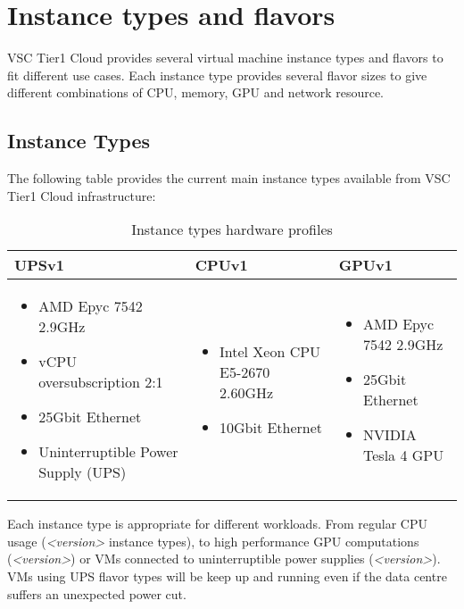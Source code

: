 \chapter{Instance types and flavors}

VSC Tier1 Cloud provides several virtual machine instance types
and flavors to fit different use cases.
Each instance type provides several flavor sizes to give different
combinations of CPU, memory, GPU and network resource.

\section{Instance Types}\label{sec:instance-types}
The following table provides the current main instance types available
from VSC Tier1 Cloud infrastructure:

\begin{table}[h!]
\centering
\begin{tabular}{ |p{6cm}|p{4cm}|p{5cm}| }
  \hline
  \rowcolor{lightgray} \textbf{UPSv1} & \textbf{CPUv1} & \textbf{GPUv1} \\
  \hline
  \begin{itemize}
    \item AMD Epyc 7542 2.9GHz
    \item vCPU oversubscription 2:1
    \item 25Gbit Ethernet
    \item Uninterruptible Power Supply (UPS)
  \end{itemize}
  &
  \begin{itemize}
    \item Intel Xeon CPU E5-2670 2.60GHz
    \item 10Gbit Ethernet
  \end{itemize}
  &
  \begin{itemize}
    \item AMD Epyc 7542 2.9GHz
    \item 25Gbit Ethernet
    \item NVIDIA Tesla 4 GPU
  \end{itemize}
  \\
  \hline
\end{tabular}
\caption{Instance types hardware profiles}
\label{table:instance-type}
\end{table}

Each instance type is appropriate for different workloads. From regular 
CPU usage (\emph{<version>} instance types), to high performance 
GPU computations (\emph{<version>}) or VMs connected to 
uninterruptible power supplies (\emph{<version>}). VMs using UPS 
flavor types will be keep up and running even if the data centre suffers
an unexpected power cut.

